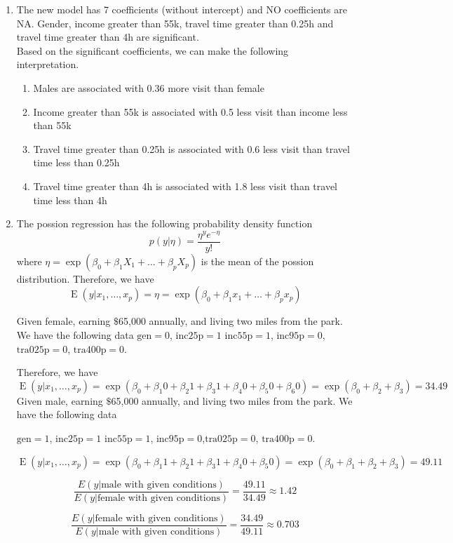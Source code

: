 \documentclass{article}
\DeclareMathOperator{\E}{E}
\begin{document}
\begin{enumerate}[label=(\alph*)]
\item 
The new model has 7 coefficients (without intercept) and NO coefficients are NA. Gender, income greater than 55k, travel time greater than 0.25h and travel time greater than 4h are significant. \\

Based on the significant coefficients, we can make the following interpretation.

\begin{enumerate}[label=(\roman*)]
    \item Males are associated with 0.36 more visit than female
    \item Income greater than 55k is associated with 0.5 less visit than income less than 55k
    \item Travel time greater than 0.25h is associated with 0.6 less visit than travel time less than 0.25h
    \item Travel time greater than 4h is associated with 1.8 less visit than travel time less than 4h

\end{enumerate}



\item
The possion regression has the following probability density function
\[
    p(y|\eta) = \frac{\eta^y e^{-\eta}}{y!}
\]
where $\eta = \exp(\beta_0 + \beta_1 X_1 + \ldots + \beta_p X_p)$ is the mean of the possion distribution. Therefore, we have
\[
    \E(y|x_1, \ldots, x_p) = \eta = \exp(\beta_0 + \beta_1 x_1 + \ldots + \beta_p x_p)
\]

Given female, earning \(\$\)65,000 annually, and living two miles from the park. We have the following data
\(\text{gen} = 0\), \(\text{inc25p} = 1\) \(\text{inc55p} = 1\), \(\text{inc95p} = 0\),\(\text{tra025p} = 0\), \(\text{tra400p} = 0\).

Therefore, we have
\[
    \E(y|x_1, \ldots, x_p) = \exp(\beta_0 + \beta_1 0 + \beta_2 1 + \beta_3 1 + \beta_4 0 + \beta_5 0 + \beta_6 0) = \exp(\beta_0 + \beta_2 + \beta_3) = 34.49
\]
Given male, earning \(\$\)65,000 annually, and living two miles from the park. We have the following data

\(\text{gen} = 1\), \(\text{inc25p} = 1\) \(\text{inc55p} = 1\), \(\text{inc95p} = 0\),\(\text{tra025p} = 0\), \(\text{tra400p} = 0\).

\[
    \E(y|x_1, \ldots, x_p) = \exp(\beta_0 + \beta_1 1 + \beta_2 1 + \beta_3 1 + \beta_4 0 + \beta_5 0) = \exp(\beta_0 + \beta_1 + \beta_2 + \beta_3) = 49.11
\]

\[\frac{E(y|\text{male with given conditions})}{E(y|\text{female with given conditions})} = \frac{49.11}{34.49} \approx 1.42\]

\[\frac{E(y|\text{female with given conditions})}{E(y|\text{male with given conditions})} = \frac{34.49}{49.11} \approx 0.703\]

\end{enumerate}
\end{document}
